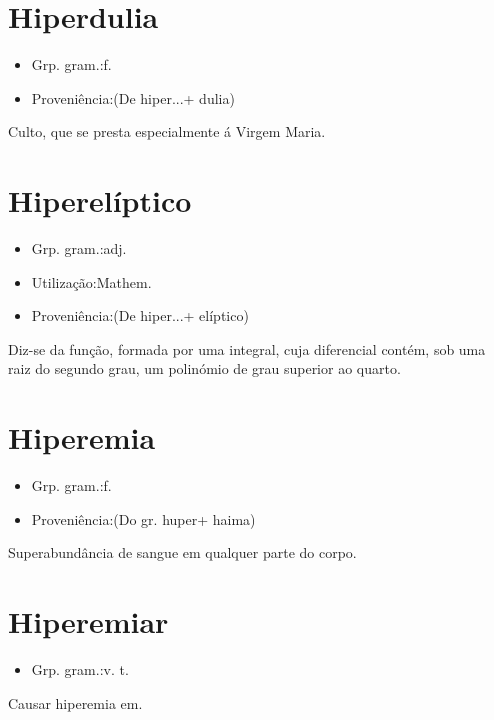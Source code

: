 \documentclass{article}
\begin{document}
\section{Hiperdulia}
\begin{itemize}
\item {Grp. gram.:f.}
\end{itemize}
\begin{itemize}
\item {Proveniência:(De \textunderscore hiper...\textunderscore  + \textunderscore dulia\textunderscore )}
\end{itemize}
Culto, que se presta especialmente á Virgem Maria.
\section{Hiperelíptico}
\begin{itemize}
\item {Grp. gram.:adj.}
\end{itemize}
\begin{itemize}
\item {Utilização:Mathem.}
\end{itemize}
\begin{itemize}
\item {Proveniência:(De \textunderscore hiper...\textunderscore  + \textunderscore elíptico\textunderscore )}
\end{itemize}
Diz-se da função, formada por uma integral, cuja diferencial contém, sob uma raiz do segundo grau, um polinómio de grau superior ao quarto.
\section{Hiperemia}
\begin{itemize}
\item {Grp. gram.:f.}
\end{itemize}
\begin{itemize}
\item {Proveniência:(Do gr. \textunderscore huper\textunderscore  + \textunderscore haima\textunderscore )}
\end{itemize}
Superabundância de sangue em qualquer parte do corpo.
\section{Hiperemiar}
\begin{itemize}
\item {Grp. gram.:v. t.}
\end{itemize}
Causar hiperemia em.
\end{document}
